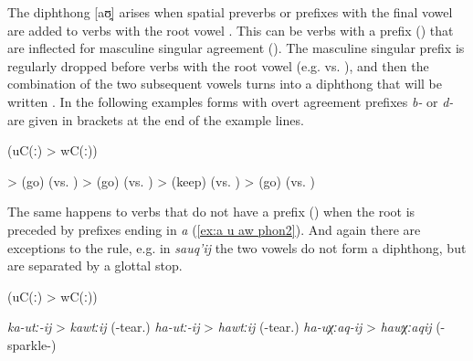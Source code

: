 The diphthong [aʊ̯] arises when spatial preverbs or  prefixes with the final vowel  are added to verbs with the root vowel . This can be verbs with a  prefix () that are inflected for masculine singular  agreement (). The masculine singular prefix  is regularly dropped before verbs with the root vowel  (e.g.   vs.  ), and then the combination of the two subsequent vowels turns into a diphthong that will be written  . In the following examples forms with overt agreement prefixes \textit{b-} or \textit{d-} are given in brackets at the end of the example lines.
%
\begin{exe}
	 (uC(ː) > wC(ː)) \label{ex:a u aw phon}
	\begin{xlist}
		\ex	{} >   (go) (vs. ) 
		\ex	{} >   (go) (vs. )
		\ex	{} >   (keep) (vs. )
		\ex	{} >   (go) (vs. )
	\end{xlist}
\end{exe}

The same happens to verbs that do not have a  prefix () when the root is preceded by prefixes ending in \textit{a} (\ref{ex:a u aw phon2}). And again there are exceptions to the rule, e.g. in \textit{sauq'ij}  the two vowels do not form a diphthong, but are separated by a glottal stop.
%
\begin{exe}
	 (uC(ː) > wC(ː)) \label{ex:a u aw phon2}
	\begin{xlist}
		\ex	\textit{ka-utː-ij} > \textit{kawtːij}  (-tear.\tsc{ipfv-inf})
		\ex \textit{ha-utː-ij} > \textit{hawtːij}  (-tear.\tsc{ipfv-inf})
		\ex \textit{ha-uχːaq-ij} > \textit{hawχːaqij}  (-sparkle-\tsc{caus-inf})
	\end{xlist}
\end{exe}

